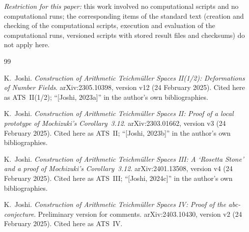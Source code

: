 \documentclass[11pt,a4paper]{article}
\theoremstyle{definition}
\theoremstyle{plain}
\theoremstyle{definition}
\begin{document}
\medskip

\noindent
\emph{Restriction for this paper:} this work involved no computational scripts and
no computational runs; the corresponding items of the standard text (creation and
checking of the computational scripts, execution and evaluation of the
computational runs, versioned scripts with stored result files and checksums) do
not apply here.

\begin{thebibliography}{99}
\small

K.~Joshi.
\newblock \emph{Construction of Arithmetic Teichmüller Spaces II(1/2):
Deformations of Number Fields}.
\newblock arXiv:2305.10398, version v12 (24 February 2025). Cited here as
ATS~II(1/2); ``[Joshi, 2023a]'' in the author's own bibliographies.

K.~Joshi.
\newblock \emph{Construction of Arithmetic Teichmüller Spaces II: Proof of a
local prototype of Mochizuki's Corollary~3.12}.
\newblock arXiv:2303.01662, version v3 (24 February 2025). Cited here as ATS~II;
``[Joshi, 2023b]'' in the author's own bibliographies.

K.~Joshi.
\newblock \emph{Construction of Arithmetic Teichmüller Spaces III: A `Rosetta
Stone' and a proof of Mochizuki's Corollary~3.12}.
\newblock arXiv:2401.13508, version v4 (24 February 2025). Cited here as
ATS~III; ``[Joshi, 2024c]'' in the author's own bibliographies.

K.~Joshi.
\newblock \emph{Construction of Arithmetic Teichmüller Spaces IV: Proof of the
abc-conjecture}. Preliminary version for comments.
\newblock arXiv:2403.10430, version v2 (24 February 2025). Cited here as ATS~IV.


\end{thebibliography}
\end{document}
